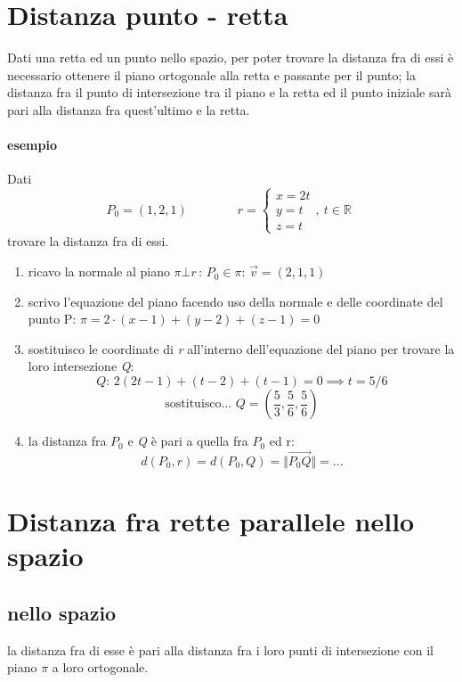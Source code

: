 	\section{Distanza punto - retta}
		Dati una retta ed un punto nello spazio, per poter trovare la distanza fra di essi è necessario ottenere il piano ortogonale alla retta e passante per il punto; la distanza fra il punto di intersezione tra il piano e la retta ed il punto iniziale sarà pari alla distanza fra quest'ultimo e la retta.
		
		\begin{GrayBox}
			\paragraph{esempio}
			Dati
			$$ P_0 = (1, 2, 1) \qquad \qquad r = \begin{cases}
				x = 2t \\
				y = t \quad , \: t \in \mathbb{R} \\
				z = t
			\end{cases} $$
		trovare la distanza fra di essi.
		
		\begin{enumerate}
			\item ricavo la normale al piano $ \pi \bot r \, : \, P_0 \in \pi $:  $ \vec{v} = (2, 1, 1) $
			\item scrivo l'equazione del piano facendo uso della normale e delle coordinate del punto P: $ \pi = 2 \cdot (x - 1) + (y - 2) + (z - 1) = 0 $
			\item sostituisco le coordinate di \textit{r} all'interno dell'equazione del piano per trovare la loro intersezione \textit{Q}:
			$$ Q : \, 2 (2t - 1) + (t - 2) + (t - 1) = 0 \implies t = 5/6 $$
			$$ \text{sostituisco... } Q = (\frac{5}{3}, \frac{5}{6}, \frac{5}{6}) $$
			\item la distanza fra $P_0$ e \textit{Q} è pari a quella fra $P_0$ ed r:
			$$ d (P_0, r) = d (P_0, Q) = \Vert \overrightarrow{P_0Q} \Vert = ... $$
		\end{enumerate}
		\end{GrayBox}
	\section{Distanza fra rette parallele nello spazio}
		\subsection{nello spazio}
			la distanza fra di esse è pari alla distanza fra i loro punti di intersezione con il piano $\pi$ a loro ortogonale.
			

